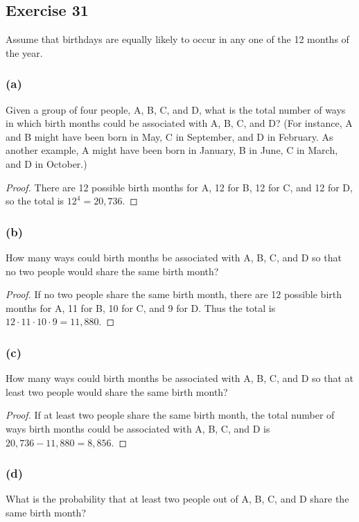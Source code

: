 \documentclass[14pt]{extarticle}
\begin{document}
\subsection{Exercise 31}
Assume that birthdays are equally likely to occur in any one of the 12 months of the year.

\subsubsection{(a)}
Given a group of four people, A, B, C, and D, what is the total number of ways in which birth months could be
associated with A, B, C, and D? (For instance, A and B might have been born in May, C in September, and D in
February. As another example, A might have been born in January, B in June, C in March, and D in October.)

\begin{proof}
     There are 12 possible birth months for A, 12 for B, 12 for C, and 12 for D, so the total is \(12^4 = 20,736\).
\end{proof}

\subsubsection{(b)}
How many ways could birth months be associated with A, B, C, and D so that no two people would share the same birth
month?

\begin{proof}
     If no two people share the same birth month, there are 12 possible birth months for A, 11 for B, 10 for C, and 9 for
     D. Thus the total is \(12 \cdot 11 \cdot 10 \cdot 9 = 11,880\).
\end{proof}

\subsubsection{(c)}
How many ways could birth months be associated with A, B, C, and D so that at least two people would share the same
birth month?

\begin{proof}
     If at least two people share the same birth month, the total number of ways birth months could be associated with A, B, C, and D is \(20,736 - 11,880 = 8,856\).
\end{proof}

\subsubsection{(d)}
What is the probability that at least two people out of A, B, C, and D share the same birth month?
\end{document}
